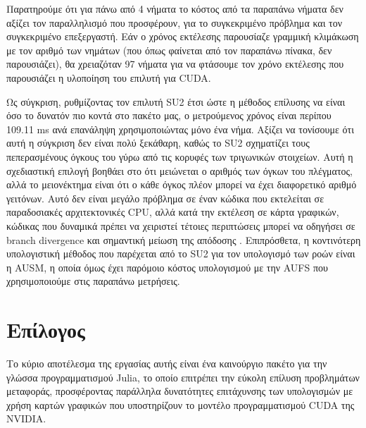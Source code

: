 Παρατηρούμε ότι για πάνω από 4 νήματα το κόστος από τα παραπάνω νήματα δεν αξίζει τον παραλληλισμό που προσφέρουν, για το συγκεκριμένο πρόβλημα και τον συγκεκριμένο επεξεργαστή.
Εάν ο χρόνος εκτέλεσης παρουσίαζε γραμμική κλιμάκωση με τον αριθμό των νημάτων (που όπως φαίνεται από τον παραπάνω πίνακα, δεν παρουσιάζει), θα χρειαζόταν 97 νήματα για να φτάσουμε τον χρόνο εκτέλεσης που παρουσιάζει η υλοποίηση του επιλυτή για CUDA.

Ως σύγκριση, ρυθμίζοντας τον επιλυτή SU2 έτσι ώστε η μέθοδος επίλυσης να είναι όσο το δυνατόν πιο κοντά στο πακέτο μας, ο μετρούμενος χρόνος είναι περίπου 109.11 ms ανά επανάληψη χρησιμοποιώντας μόνο ένα νήμα.
Αξίζει να τονίσουμε ότι αυτή η σύγκριση δεν είναι πολύ ξεκάθαρη, καθώς το SU2 σχηματίζει τους πεπερασμένους όγκους του γύρω από τις κορυφές των τριγωνικών στοιχείων.
Αυτή η σχεδιαστική επιλογή βοηθάει στο ότι μειώνεται ο αριθμός των όγκων του πλέγματος, αλλά το μειονέκτημα είναι ότι ο κάθε όγκος πλέον μπορεί να έχει διαφορετικό αριθμό γειτόνων.
Αυτό δεν είναι μεγάλο πρόβλημα σε έναν κώδικα που εκτελείται σε παραδοσιακές αρχιτεκτονικές CPU, αλλά κατά την εκτέλεση σε κάρτα γραφικών, κώδικας που δυναμικά πρέπει να χειριστεί τέτοιες περιπτώσεις μπορεί να οδηγήσει σε branch divergence και σημαντική μείωση της απόδοσης \cite{Patterson2017}.
Επιπρόσθετα, η κοντινότερη υπολογιστική μέθοδος που παρέχεται από το SU2 για τον υπολογισμό των ροών είναι η AUSM, η οποία όμως έχει παρόμοιο κόστος υπολογισμού με την AUFS που χρησιμοποιούμε στις παραπάνω μετρήσεις.

\section{Επίλογος}

Το κύριο αποτέλεσμα της εργασίας αυτής είναι ένα καινούργιο πακέτο για την γλώσσα προγραμματισμού Julia, το οποίο επιτρέπει την εύκολη επίλυση προβλημάτων μεταφοράς, προσφέροντας παράλληλα δυνατότητες επιτάχυνσης των υπολογισμών με χρήση καρτών γραφικών που υποστηρίζουν το μοντέλο προγραμματισμού CUDA της NVIDIA.

